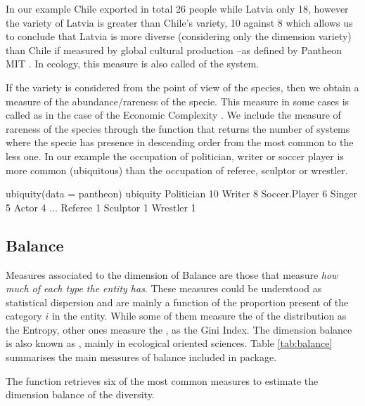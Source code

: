 In our example Chile exported in total 26 people while Latvia only 18, however the variety of Latvia is greater than Chile's variety, 10 against 8 which allows us to conclude that Latvia is more diverse (considering only the dimension variety) than Chile if measured by global cultural production --as defined by Pantheon MIT \cite{macroconnections_mit_medialab_pantheon_2014}. In ecology, this measure is also called  of the system.

If the variety is considered from the point of view of the species, then we obtain a measure of the abundance/rareness of the specie. This measure in some cases is called  as in the case of the Economic Complexity \cite[p. 21]{hausmann_atlas_2011}. 
We include the measure of rareness of the species through the function  that returns the number of systems where the specie has presence in descending order from the most common to the less one.
In our example the occupation of politician, writer or soccer player is more common (ubiquitous) than the occupation of referee, sculptor or wrestler. 

\begin{example}
   ubiquity(data = pantheon)
                    ubiquity
Politician                10
Writer                     8
Soccer.Player              6
Singer                     5
Actor                      4
...
Referee                    1
Sculptor                   1
Wrestler                   1
\end{example}

\subsection{Balance}
Measures associated to the dimension of Balance are those that measure \emph{how much of each type the entity has}. These measures could be understood as statistical dispersion and are mainly a function of the proportion present of the category $i$ in the entity. While some of them measure the  of the distribution as the Entropy, other ones measure the , as the Gini Index. The dimension balance is also known as , mainly in ecological oriented sciences. Table \ref{tab:balance} summarises the main measures of balance included in  package.

The function  retrieves six of the most common measures to estimate the dimension balance of the diversity. 

